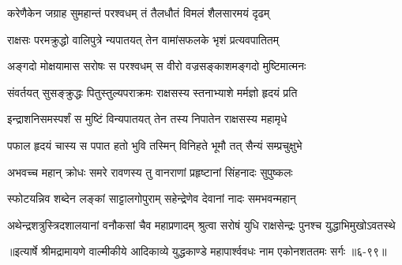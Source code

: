 \twolineshloka
{करेणैकेन जग्राह सुमहान्तं परश्वधम्}
{तं तैलधौतं विमलं शैलसारमयं दृढम्} %

\twolineshloka
{राक्षसः परमक्रुद्धो वालिपुत्रे न्यपातयत्}
{तेन वामांसफलके भृशं प्रत्यवपातितम्} %

\twolineshloka
{अङ्गदो मोक्षयामास सरोषः स परश्वधम्}
{स वीरो वज्रसङ्काशमङ्गदो मुष्टिमात्मनः} %

\twolineshloka
{संवर्तयत् सुसङ्क्रुद्धः पितुस्तुल्यपराक्रमः}
{राक्षसस्य स्तनाभ्याशे मर्मज्ञो हृदयं प्रति} %

\twolineshloka
{इन्द्राशनिसमस्पर्शं स मुष्टिं विन्यपातयत्}
{तेन तस्य निपातेन राक्षसस्य महामृधे} %

\twolineshloka
{पफाल हृदयं चास्य स पपात हतो भुवि}
{तस्मिन् विनिहते भूमौ तत् सैन्यं सम्प्रचुक्षुभे} %

\twolineshloka
{अभवच्च महान् क्रोधः समरे रावणस्य तु}
{वानराणां प्रहृष्टानां सिंहनादः सुपुष्कलः} %

\twolineshloka
{स्फोटयन्निव शब्देन लङ्कां साट्टालगोपुराम्}
{सहेन्द्रेणेव देवानां नादः समभवन्महान्} %

\twolineshloka
{अथेन्द्रशत्रुस्त्रिदशालयानां वनौकसां चैव महाप्रणादम्}
{श्रुत्वा सरोषं युधि राक्षसेन्द्रः पुनश्च युद्धाभिमुखोऽवतस्थे} %


॥इत्यार्षे श्रीमद्रामायणे वाल्मीकीये आदिकाव्ये युद्धकाण्डे महापार्श्ववधः नाम एकोनशततमः सर्गः ॥६-९९॥
